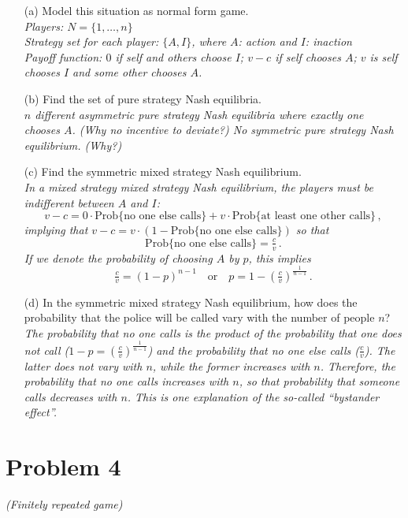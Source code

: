 \documentclass{article}
\begin{document}
\begin{itemize}
\item[(a)] Model this situation as normal form game. \textit{ \\ Players: $N = \{1, \dots , n \}$ \\ Strategy set for each player: $\{A, I \}$, where $A$: action and $I$: inaction \\ Payoff function: $0$ if self and others choose $I$; $v-c$ if self chooses $A$; $v$ is self chooses $I$ and some other chooses $A$.}
%
\item[(b)] Find the set of pure strategy Nash equilibria. \textit{ \\ $n$ different asymmetric pure strategy Nash equilibria where exactly one chooses $A$. (Why no incentive to deviate?) No symmetric pure strategy Nash equilibrium. (Why?)}
%
\item[(c)] Find the symmetric mixed strategy Nash equilibrium. \textit{ \\ In a mixed strategy mixed strategy Nash equilibrium, the players must be indifferent between $A$ and $I$:$$v-c = 0 \cdot \text{Prob}\{\text{no one else calls}\} + v \cdot \text{Prob}\{\text{at least one other calls}\} \, ,$$implying that $v-c = v \cdot (1 - \text{Prob}\{\text{no one else calls}\})$ so that $$\text{Prob}\{\text{no one else calls}\} = \tfrac{c}{v} \, .$$If we denote the probability of choosing $A$ by $p$, this implies$$\tfrac{c}{v} = (1-p)^{n-1} \quad \text{or} \quad p = 1 - \left( \tfrac{c}{v} \right)^\frac1{n-1} \, .$$ }
%
\item[(d)] In the symmetric mixed strategy Nash equilibrium, how does the probability that the
police will be called vary with the number of people $n$? \textit{ \\ The probability that no one calls is the product of the probability that one does not call ($1 - p = \left( \tfrac{c}{v} \right)^\frac1{n-1}$) and the probability that no one else calls ($\tfrac{c}{v}$). The latter does not vary with $n$, while the former increases with $n$. Therefore, the probability that no one calls increases with $n$, so that probability that someone calls decreases with $n$. This is one explanation of the so-called ``bystander effect''.}
%
\end{itemize}
\vspace{-6pt}



\section{Problem 4} \textit{(Finitely repeated game)}
\end{document}
